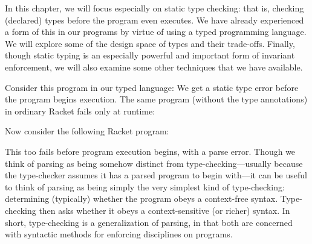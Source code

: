 
In this chapter, we will focus especially on static type checking: that is,
checking (declared) types before the program even executes. We have already
experienced a form of this in our programs by virtue of using a typed
programming language. We will explore some of the design space of types and
their trade-offs. Finally, though static typing is an especially powerful and
important form of invariant enforcement, we will also examine some other
techniques that we have available.

Consider this program in our typed language:
We get a static type error before the program begins execution. The same program
(without the type annotations) in ordinary Racket fails only at runtime:


Now consider the following Racket program:

This too fails before program execution begins, with a parse error. Though we
think of parsing as being somehow distinct from type-checking—usually because
the type-checker assumes it has a parsed program to begin with—it can be useful
to think of parsing as being simply the very simplest kind of type-checking:
determining (typically) whether the program obeys a context-free syntax.
Type-checking then asks whether it obeys a context-sensitive (or richer) syntax.
In short, type-checking is a generalization of parsing, in that both are
concerned with syntactic methods for enforcing disciplines on programs.
